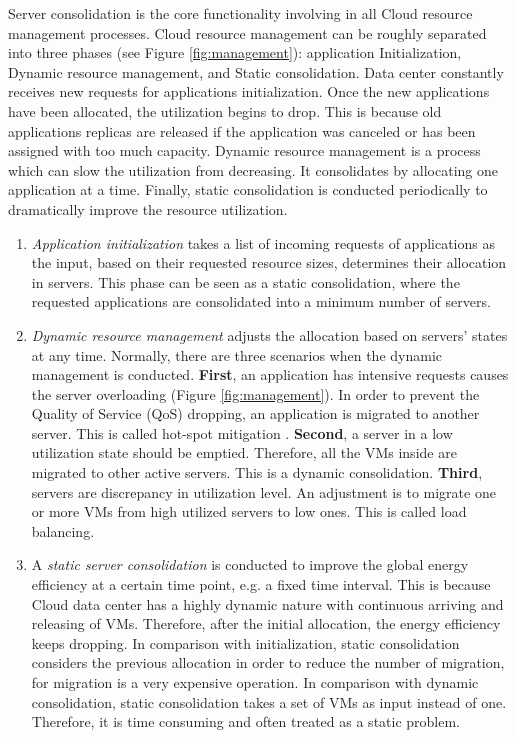 Server consolidation is the core functionality involving in all Cloud resource management processes. Cloud resource management can be roughly separated into three phases \cite{Svard:2015ic, Mishra:2012kx} (see Figure \ref{fig:management}): application Initialization, Dynamic resource management, and Static consolidation. Data center constantly receives new requests for applications initialization. Once the new applications have been allocated, the utilization begins to drop. This is because old applications replicas are released if the application was canceled or has been assigned with too much capacity. Dynamic resource management is a process which can slow the utilization from decreasing. It consolidates by allocating one application at a time. Finally, static consolidation is conducted periodically to dramatically improve the resource utilization.
\begin{enumerate}
	\item \emph{Application initialization} takes a list of incoming requests of applications as the input, based on their requested resource sizes, determines their allocation in servers. This phase can be seen as a static consolidation, where the requested applications are consolidated into a minimum number of servers.
	\item \emph{Dynamic resource management} adjusts the allocation based on servers' states at any time. Normally, there are three scenarios when the dynamic management is conducted. \textbf{First}, an application has intensive requests causes the server overloading (Figure \ref{fig:management}). In order to prevent the Quality of Service (QoS) dropping, an application is migrated to another server. This is called hot-spot mitigation \cite{Mishra:2012kx}. \textbf{Second}, a server in a low utilization state should be emptied. Therefore, all the VMs inside are migrated to other active servers. This is a dynamic consolidation. \textbf{Third}, servers are discrepancy in utilization level. An adjustment is to migrate one or more VMs from high utilized servers to low ones. This is called load balancing.
	\item A \emph{static server consolidation} is conducted to improve the global energy efficiency at a certain time point, e.g. a fixed time interval. This is because Cloud data center has a highly dynamic nature with continuous arriving and releasing of VMs. Therefore, after the initial allocation, the energy efficiency keeps dropping. In comparison with initialization, static consolidation considers the previous allocation in order to reduce the number of migration, for migration is a very expensive operation. In comparison with dynamic consolidation, static consolidation takes a set of VMs as input instead of one. Therefore, it is time consuming and often treated as a static problem.
\end{enumerate}

